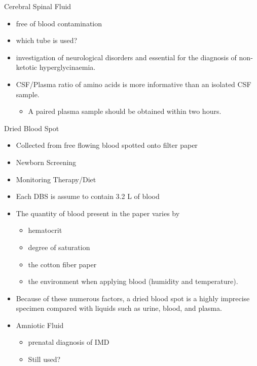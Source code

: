 \documentclass[presentation, smaller]{beamer}
\begin{document}
\begin{frame}[label={sec:orgheadline8}]{Cerebral Spinal Fluid}
\begin{itemize}
\item free of blood contamination
\item which tube is used?
\item investigation of neurological disorders and essential for the
diagnosis of non-ketotic hyperglycinaemia.
\item CSF/Plasma ratio of amino acids is more informative than an isolated CSF sample.
\begin{itemize}
\item A paired plasma sample should be obtained within two hours.
\end{itemize}
\end{itemize}
\end{frame}
\begin{frame}[label={sec:orgheadline9}]{Dried Blood Spot}
\begin{itemize}
\item Collected from free flowing blood spotted onto filter paper
\item Newborn Screening
\item Monitoring Therapy/Diet
\item Each DBS is assume to contain 3.2 \textmu{}L of blood
\item The quantity of blood present in the paper varies by
\begin{itemize}
\item hematocrit
\item degree of saturation
\item the cotton fiber paper
\item the environment  when applying blood (humidity and temperature).
\end{itemize}
\item Because of these numerous factors, a dried blood spot is a highly
imprecise specimen compared with liquids such as urine, blood, and plasma.

\item Amniotic Fluid
\begin{itemize}
\item prenatal diagnosis of IMD

\item Still used?
\end{itemize}
\end{itemize}
\end{frame}
\end{document}
